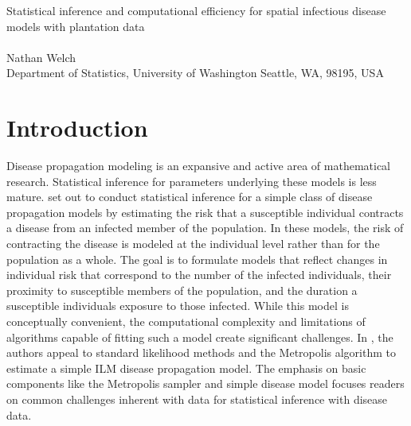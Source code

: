 \documentclass{uwstat572}
\begin{document}

\begin{center}
  {\LARGE Statistical inference and computational efficiency for spatial infectious disease models with plantation data}\\\ \\
  {Nathan Welch \\ 
    Department of Statistics, University of Washington Seattle, WA, 98195, USA
  }
\end{center}

\begin{abstract}
This report examines the findings published in \textit{Statistical inference and computational efficiency for spatial infectious disease models with plantation data} \cite{Brown}. 
This paper aims conduct statistical inference on parameters associated with a simple individual level model. 
Model parameters are estimated using the Metropolis sampling algorithm; however, the computation burden created by fitting even a simple model leads to prohibitively long computation time. 
Statistical and computational methods to overcome the computing challenge are reviewed as a result. 
\end{abstract}

\section{Introduction}

Disease propagation modeling is an expansive and active area of mathematical research.
Statistical inference for parameters underlying these models is less mature.
\cite{Brown} set out to conduct statistical inference for a simple class of disease propagation models by estimating the risk that a susceptible individual contracts a disease from an infected member of the population. 
In these models, the risk of contracting the disease is modeled at the individual level rather than for the population as a whole. 
The goal is to formulate models that reflect changes in individual risk that correspond to the number of the infected individuals, their proximity to susceptible members of the population, and the duration a susceptible individuals  exposure to those infected. 
While this model is conceptually convenient, the computational complexity and limitations of algorithms capable of fitting such a model create significant challenges.
In \cite{Brown}, the authors appeal to standard likelihood methods and the Metropolis algorithm to estimate a simple ILM disease propagation model.
The emphasis on basic components like the Metropolis sampler and simple disease model focuses readers on common challenges inherent with data for statistical inference with disease data. 
\end{document}
